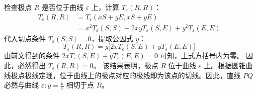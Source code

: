 \begin{solution}
检查极点 $R$ 是否位于曲线 $\varepsilon$ 上，计算 $T_\varepsilon(R,R)$：
\begin{align*}
T_\varepsilon(R,R) &= T_\varepsilon(xS + yE, xS + yE) \\
&= x^2 T_\varepsilon(S,S) + 2xy T_\varepsilon(S,E) + y^2 T_\varepsilon(E,E)
\end{align*}
代入切点条件 $T_\varepsilon(S,S) = 0$，提取公因式 $y$：
\[ T_\varepsilon(R,R) = y \big[ 2x T_\varepsilon(S,E) + y T_\varepsilon(E,E) \big] \]
由前文得到的条件 $2x T_\varepsilon(S,E) + y T_\varepsilon(E,E) = 0$ 可知，上式方括号内为零。
因此，必然得出 $T_\varepsilon(R,R) = 0$。
该结果表明，极点 $R$ 位于曲线 $\varepsilon$ 上。根据圆锥曲线极点极线定理，位于曲线上的极点对应的极线即为该点的切线。因此，直线 $PQ$ 必然与曲线 $\varepsilon: y = \frac{k}{x}$ 相切于点 $R$。
\end{solution}



